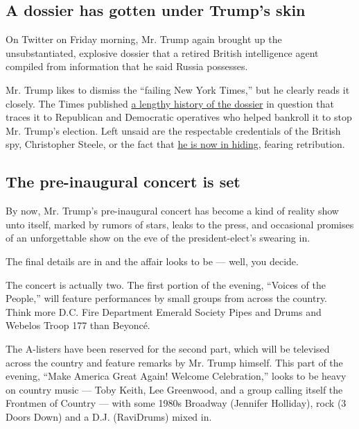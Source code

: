 \hypertarget{a-dossier-has-gotten-under-trumps-skin}{%
\subsection{A dossier has gotten under Trump's
skin}\label{a-dossier-has-gotten-under-trumps-skin}}

On Twitter on Friday morning, Mr. Trump again brought up the
unsubstantiated, explosive dossier that a retired British intelligence
agent compiled from information that he said Russia possesses.

Mr. Trump likes to dismiss the ``failing New York Times,'' but he
clearly reads it closely. The Times published
\href{https://www.nytimes.com/2017/01/11/us/politics/donald-trump-russia-intelligence.html?_r=0}{a
lengthy history of the dossier} in question that traces it to Republican
and Democratic operatives who helped bankroll it to stop Mr. Trump's
election. Left unsaid are the respectable credentials of the British
spy, Christopher Steele, or the fact that
\href{https://www.nytimes.com/2017/01/12/world/europe/christopher-steele-trump-russia-dossier.html}{he
is now in hiding}, fearing retribution.

\hypertarget{the-pre-inaugural-concert-is-set}{%
\subsection{The pre-inaugural concert is
set}\label{the-pre-inaugural-concert-is-set}}

By now, Mr. Trump's pre-inaugural concert has become a kind of reality
show unto itself, marked by rumors of stars, leaks to the press, and
occasional promises of an unforgettable show on the eve of the
president-elect's swearing in.

The final details are in and the affair looks to be --- well, you
decide.

The concert is actually two. The first portion of the evening, ``Voices
of the People,'' will feature performances by small groups from across
the country. Think more D.C. Fire Department Emerald Society Pipes and
Drums and Webelos Troop 177 than Beyoncé.

The A-listers have been reserved for the second part, which will be
televised across the country and feature remarks by Mr. Trump himself.
This part of the evening, ``Make America Great Again! Welcome
Celebration,'' looks to be heavy on country music --- Toby Keith, Lee
Greenwood, and a group calling itself the Frontmen of Country --- with
some 1980s Broadway (Jennifer Holliday), rock (3 Doors Down) and a D.J.
(RaviDrums) mixed in.

